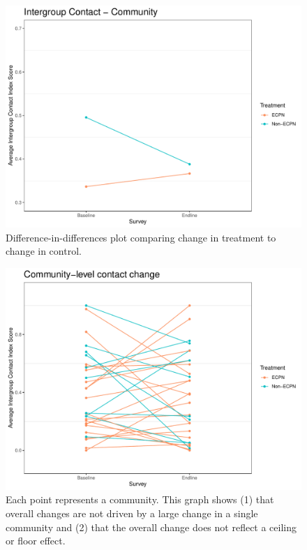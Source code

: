 \documentclass[
]{article}
\begin{document}
\begin{figure}[H]
\centering
\includegraphics[width=\linewidth]{../data_and_code/survey_dat/figs/did_plots/finished_didPlots/conComm_plot.pdf}
\caption{Difference-in-differences plot comparing change in treatment to change in control.}\label{fig:con_comm}
\end{figure}

\begin{figure}[H]
\centering
\includegraphics[width=\linewidth]{../data_and_code/survey_dat/figs/did_plots/conComm_plot_disag.pdf}
\caption{Each point represents a community. This graph shows (1) that overall changes are not driven by a large change in a single community and (2) that the overall change does not reflect a ceiling or floor effect.}\label{fig:con_comm_dis}
\end{figure}
\end{document}
